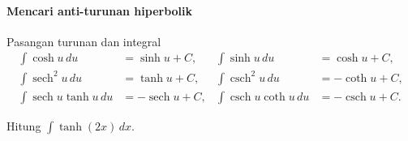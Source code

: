 \documentclass{../../kalkulus-ppt}
\DeclareMathOperator{\sech}{sech}
\DeclareMathOperator{\csch}{csch}
\begin{document}
\begin{frame}{\insertsection}
    \framesubtitle{Mencari anti-turunan hiperbolik}
    \begin{block}{Pasangan turunan dan integral}
        \[
            \begin{aligned}
                \int\cosh u\,du&=\sinh u+C,&
                \int\sinh u\,du&=\cosh u+C,\\
                \int\sech^2u\,du&=\tanh u+C,&
                \int\csch^2u\,du&=-\coth u+C,\\
                \int\sech u\tanh u\,du&=-\sech u+C,&
                \int\csch u\coth u\,du&=-\csch u+C.
            \end{aligned}
        \]
    \end{block}
    \begin{contoh}
        Hitung $\int\tanh(2x)\,dx$.
    \end{contoh}
\end{frame}
\end{document}
